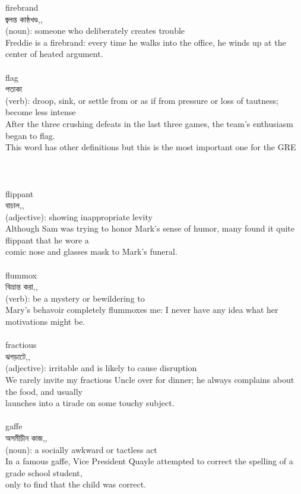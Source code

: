 \documentclass{article}
\begin{document}
{{firebrand}\\
{জ্বলন্ত কাষ্ঠখণ্ড,,}\\
{(noun): someone who deliberately creates trouble\\Freddie is a firebrand: every time he walks into the office, he winds up at the center of heated argument.\\}\\
{flag}\\
{পতাকা}\\
{(verb): droop, sink, or settle from or as if from pressure or loss of tautness; become less intense\\After the three crushing defeats in the last three games, the team's enthusiasm began to flag.\\This word has other definitions but this is the most important one for the GRE\\\\                                                                               \\}\\
{flippant}\\
{বাচাল,,}\\
{(adjective): showing inappropriate levity\\Although Sam was trying to honor Mark's sense of humor, many found it quite flippant that he wore a\\comic nose and glasses mask to Mark's funeral.\\}\\
{flummox}\\
{বিভ্রান্ত করা,,}\\
{(verb): be a mystery or bewildering to\\Mary's behavoir completely flummoxes me: I never have any idea what her motivations might be.\\}\\
{fractious}\\
{ঝগড়াটে,,}\\
{(adjective): irritable and is likely to cause disruption\\We rarely invite my fractious Uncle over for dinner; he always complains about the food, and usually\\launches into a tirade on some touchy subject.\\}\\
{gaffe}\\
{অসমীচীন কাজ,,}\\
{(noun): a socially awkward or tactless act\\In a famous gaffe, Vice President Quayle attempted to correct the spelling of a grade school student,\\only to find that the child was correct.\\}\\
}
\end{document}
